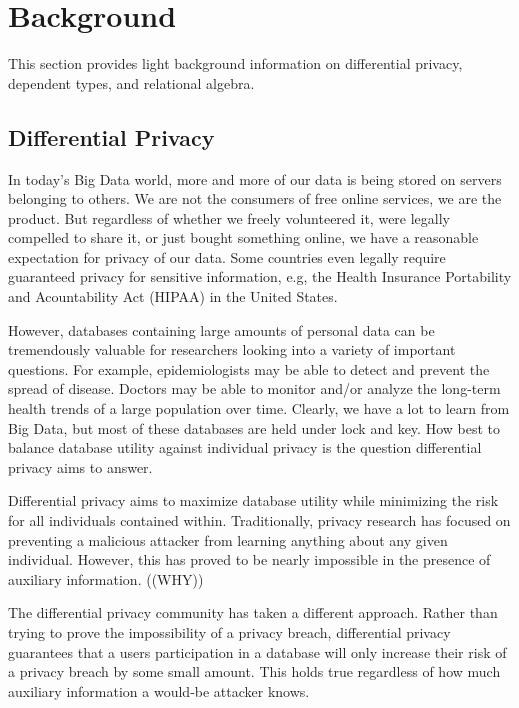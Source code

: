\documentclass[12pt]{article}
\begin{document}
\section{Background}\label{sec:background}

This section provides light background information on differential privacy, dependent types, and relational algebra.

\subsection{Differential Privacy}\label{sec:differential_privacy}

In today's Big Data world, more and more of our data is being stored on servers belonging to others.
We are not the consumers of free online services, we are the product.
But regardless of whether we freely volunteered it, were legally compelled to share it, or just bought something online, we have a reasonable expectation for privacy of our data.
Some countries even legally require guaranteed privacy for sensitive information, e.g, the Health Insurance Portability and Acountability Act (HIPAA) in the United States.

However, databases containing large amounts of personal data can be tremendously valuable for researchers looking into a variety of important questions.
For example, epidemiologists may be able to detect and prevent the spread of disease.
Doctors may be able to monitor and/or analyze the long-term health trends of a large population over time.
Clearly, we have a lot to learn from Big Data, but most of these databases are held under lock and key.
How best to balance database utility against individual privacy is the question differential privacy aims to answer.

Differential privacy aims to maximize database utility while minimizing the risk for all individuals contained within.
Traditionally, privacy research has focused on preventing a malicious attacker from learning anything about any given individual.
However, this has proved to be nearly impossible in the presence of auxiliary information. ((WHY))

The differential privacy community has taken a different approach.
Rather than trying to prove the impossibility of a privacy breach, differential privacy guarantees that a users participation in a database will only increase their risk of a privacy breach by some small amount.
This holds true regardless of how much auxiliary information a would-be attacker knows.
\end{document}
